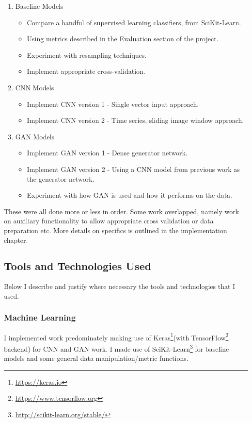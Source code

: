 \documentclass[12pt,a4paper,twoside]{report}
\begin{document}
\begin{enumerate}
   \item Baseline Models
   \begin{itemize}
     \item Compare a handful of supervised learning classifiers, from SciKit-Learn.
     \item Using metrics described in the Evaluation section of the project.
     \item Experiment with resampling techniques. 
     \item Implement appropriate cross-validation.
   \end{itemize}
   \item CNN Models
   \begin{itemize}
     \item Implement CNN version 1 - Single vector input approach.
     \item Implement CNN version 2 - Time series, sliding image window approach.
   \end{itemize}
   \item GAN Models
   \begin{itemize}
     \item Implement GAN version 1 - Dense generator network.
     \item Implement GAN version 2 - Using a CNN model from previous work as the generator network.
     \item Experiment with how GAN is used and how it performs on the data.
   \end{itemize}
\end{enumerate}

 These were all done more or less in order. Some work overlapped, namely work on auxiliary functionality to allow appropriate cross validation or data preparation etc. More details on specifics is outlined in the implementation chapter. 
  
\subsection{Tools and Technologies Used} \label{tools}

Below I describe and justify where necessary the tools and technologies that I used.

\subsubsection{Machine Learning}

I implemented work predominately making use of Keras\footnote{\href{https://keras.io}{https://keras.io}}(with TensorFlow\footnote{\href{https://www.tensorflow.org}{https://www.tensorflow.org}} backend) for CNN and GAN work. I made use of SciKit-Learn\footnote{\href{ http://scikit-learn.org/stable/}{ http://scikit-learn.org/stable/}} for baseline models and some general data manipulation/metric functions. 
\end{document}
